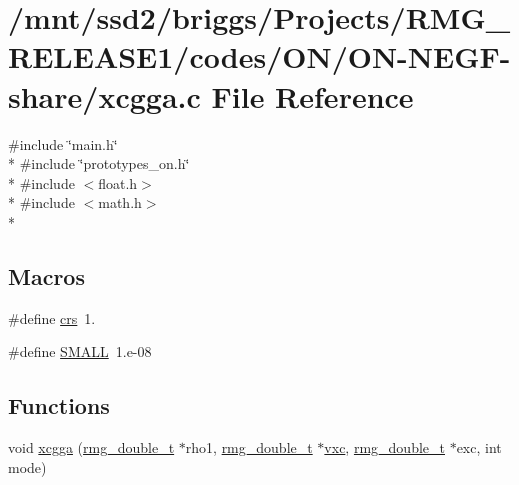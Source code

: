 \hypertarget{_o_n_2_o_n-_n_e_g_f-share_2xcgga_8c}{\section{/mnt/ssd2/briggs/\-Projects/\-R\-M\-G\-\_\-\-R\-E\-L\-E\-A\-S\-E1/codes/\-O\-N/\-O\-N-\/\-N\-E\-G\-F-\/share/xcgga.c File Reference}
\label{_o_n_2_o_n-_n_e_g_f-share_2xcgga_8c}
}
{\ttfamily \#include \char`\"{}main.\-h\char`\"{}}\\*
{\ttfamily \#include \char`\"{}prototypes\-\_\-on.\-h\char`\"{}}\\*
{\ttfamily \#include $<$float.\-h$>$}\\*
{\ttfamily \#include $<$math.\-h$>$}\\*
\subsection*{Macros}
\begin{DoxyCompactItemize}
\item 
\#define \hyperlink{_o_n_2_o_n-_n_e_g_f-share_2xcgga_8c_a9bdd976e97cd44fd0a6d3a22b2d3d0fb}{crs}~1.
\item 
\#define \hyperlink{_o_n_2_o_n-_n_e_g_f-share_2xcgga_8c_a09c78d2f8feb311dd9fc969a0bf84979}{S\-M\-A\-L\-L}~1.e-\/08
\end{DoxyCompactItemize}
\subsection*{Functions}
\begin{DoxyCompactItemize}
\item 
void \hyperlink{_o_n_2_o_n-_n_e_g_f-share_2xcgga_8c_af03bc04e80576a3c700241c2964ecaec}{xcgga} (\hyperlink{rmgtypes_8h_aaa16921c14f121c56eaa42390a340db8}{rmg\-\_\-double\-\_\-t} $\ast$rho1, \hyperlink{rmgtypes_8h_aaa16921c14f121c56eaa42390a340db8}{rmg\-\_\-double\-\_\-t} $\ast$\hyperlink{md_8h_a48f792faf570d41e1d58b4a4e1bce251}{vxc}, \hyperlink{rmgtypes_8h_aaa16921c14f121c56eaa42390a340db8}{rmg\-\_\-double\-\_\-t} $\ast$exc, int mode)
\end{DoxyCompactItemize}


